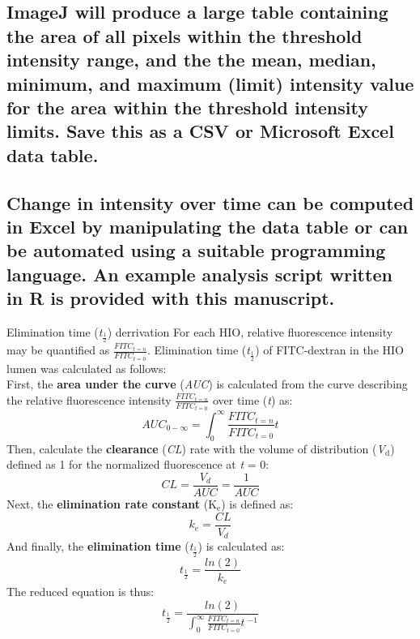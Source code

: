 \documentclass[11pt]{article}
\begin{document}
\subsection{{\sffamily } ImageJ will produce a large table containing the area of all pixels within the threshold intensity range, and the the mean, median, minimum, and maximum (limit) intensity value for the area within the threshold intensity limits. Save this as a CSV or Microsoft Excel data table.}
\label{sec:orgheadline72}
\subsection{{\sffamily } Change in intensity over time can be computed in Excel by manipulating the data table or can be automated using a suitable programming language. An example analysis script written in R\supercite{CRAN:2017} is provided with this manuscript.}
\label{sec:orgheadline73}
\begin{bclogo}[logo=\bccrayon, couleurBarre=gray!10, noborder=true, couleur=gray!10]{     Elimination time (\textit{t}$_\frac{1}{2}$) derrivation}
For each HIO, relative fluorescence intensity may be quantified as \(\frac{FITC_{t=n}}{FITC_{t=0}}\). Elimination time\supercite{rosenbaum2016basic} (\textit{t}\(_\frac{1}{2}\)) of FITC-dextran in the HIO lumen was calculated as follows:\\

First, the \textbf{area under the curve} (\emph{AUC}) is calculated from the curve describing the relative fluorescence intensity \(\frac{FITC_{t=n}}{FITC_{t=0}}\) over time (\emph{t}) as:\\
\begin{equation}
AUC_{0-\infty} =  \int_{0}^{\infty} \frac{FITC_{t=n}}{FITC_{t=0}}t
\end{equation}
Then, calculate the \textbf{clearance} (\emph{CL}) rate with the volume of distribution (\emph{V\(_{\text{d}}\)}) defined as 1 for the normalized fluorescence at \emph{t} = 0:\\
\begin{equation}
CL = \frac{V_d}{AUC} = \frac{1}{AUC}
\end{equation}
Next, the \textbf{elimination rate constant} (K\(_{\text{e}}\)) is defined as:\\
\begin{equation}
k_e = \frac{CL}{V_d}
\end{equation}
And finally, the \textbf{elimination time} (\textit{t}\(_\frac{1}{2}\)) is calculated as:\\
\begin{equation}
t_{\frac{1}{2}} = \frac{ln(2)}{k_e}
\end{equation}
The reduced equation is thus:\\
\begin{equation}
t_{\frac{1}{2}} = \frac{ln(2)}{{\int_{0}^{\infty} \frac{FITC_{t=n}}{FITC_{t=0}}t\:^{-1}}}
\end{equation}

\end{bclogo}
\end{document}
